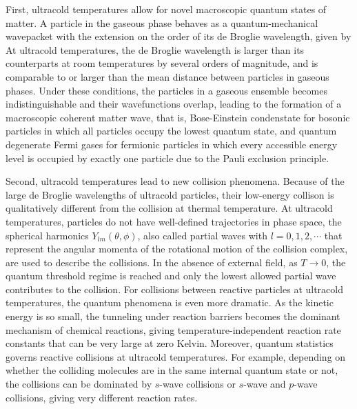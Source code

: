 First, ultracold temperatures allow for novel macroscopic quantum states of matter. A particle in the gaseous phase behaves as a quantum-mechanical 
wavepacket with the extension on the order of its de Broglie wavelength, given by
At ultracold temperatures, the de Broglie wavelength is larger than its counterparts at room temperatures by several orders of magnitude, 
and is comparable to or larger than the mean distance between particles in gaseous phases. Under these conditions,
the particles in a gaseous ensemble becomes indistinguishable and their wavefunctions overlap, leading to the formation of
a macroscopic coherent matter wave, that is, Bose-Einstein condenstate\cite{ketterle2002, anglin2002} for bosonic 
particles in which all particles occupy the lowest quantum state, and quantum degenerate Fermi gases\cite{lev2002, stefano2008} for fermionic 
particles in which every accessible energy level is occupied by exactly one particle due to the Pauli exclusion principle. 

Second, ultracold temperatures lead to new collision phenomena.
Because of the large de Broglie wavelengths of ultracold particles, their low-energy collison is 
qualitatively different from the collision at thermal temperature. At ultracold temperatures, particles
do not have well-defined trajectories in phase space, the spherical harmonics $Y_{lm}(\theta, \phi)$, also called 
partial waves with $l = 0, 1, 2, \cdots$ that represent the angular momenta of the rotational motion of the collision complex,  are used to describe the collisions. In the absence of external field, as $T 
\rightarrow 0$, the quantum threshold regime is reached and only the lowest allowed partial wave contributes to the 
collision\cite{wigner1948, krems2005}. For collisions between reactive particles at ultracold temperatures, the quantum phenomena is
even more dramatic. As the kinetic energy is so small, the tunneling under reaction barriers becomes the 
dominant mechanism of chemical reactions, giving temperature-independent reaction rate constants that 
can be very large at zero Kelvin\cite{balakrishnan2001, bodo2002, bodo2004, weck2004}. Moreover, quantum statistics 
governs reactive collisions at ultracold temperatures. For example, depending on 
whether the colliding molecules are in the same internal quantum state or not, the collisions can be dominated by 
$s$-wave collisions or $s$-wave and $p$-wave collisions, giving very different reaction rates\cite{ospelkaus2010}. 

